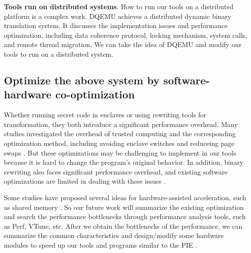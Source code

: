 \textbf{Tools run on distributed systems}.
How to run our tools on a distributed platform is a complex work.
DQEMU \cite{Zhao2020DQEMUAS} achieves a distributed dynamic binary translation system.
It discusses the implementation issues and performance optimization, including
data coherence protocol, locking mechanism, system calls, and remote thread migration.
We can take the idea of DQEMU and modify our tools to run on a distributed system.

\subsection{Optimize the above system by software-hardware co-optimization}
Whether running secret code in enclaves or using rewriting tools for transformation,
they both introduce a significant performance overhead.
Many studies investigated the overhead of trusted computing and 
the corresponding optimization method, including avoiding enclave switches
\cite{Tian2018SwitchlessCM} and reduceing page swaps \cite{Orenbach2017EleosEO, Taassori2018VAULTRP}.
But these optimizations may be challenging to implement in our tools because it is hard
to change the program's original behavior. 
In addition, binary rewriting also faces significant performance overhead, and existing
software optimizations are limited in dealing with these issues \cite{Kim2003HardwareSF}.

Some studies have proposed several ideas for hardware-assisted acceleration, such as
shared memory \cite{Jiang2022CRONUSFS}.
So our future work will summarize the existing optimization and search the performance
bottlenecks through performance analysis tools, such as Perf, VTune, etc.
After we obtain the bottlenecks of the performance, we can summarize the common characteristics
and design/modify some hardware modules to speed up our tools and programs similar to
the PIE \cite{Schneider2021PIEAP}.